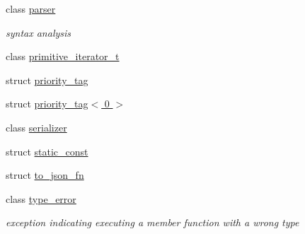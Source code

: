 \begin{DoxyCompactItemize}
class \hyperlink{classnlohmann_1_1detail_1_1parser}{parser}
\begin{DoxyCompactList}\small\item\em syntax analysis \end{DoxyCompactList}\item 
class \hyperlink{classnlohmann_1_1detail_1_1primitive__iterator__t}{primitive\+\_\+iterator\+\_\+t}
\item 
struct \hyperlink{structnlohmann_1_1detail_1_1priority__tag}{priority\+\_\+tag}
\item 
struct \hyperlink{structnlohmann_1_1detail_1_1priority__tag_3_010_01_4}{priority\+\_\+tag$<$ 0 $>$}
\item 
class \hyperlink{classnlohmann_1_1detail_1_1serializer}{serializer}
\item 
struct \hyperlink{structnlohmann_1_1detail_1_1static__const}{static\+\_\+const}
\item 
struct \hyperlink{structnlohmann_1_1detail_1_1to__json__fn}{to\+\_\+json\+\_\+fn}
\item 
class \hyperlink{classnlohmann_1_1detail_1_1type__error}{type\+\_\+error}
\begin{DoxyCompactList}\small\item\em exception indicating executing a member function with a wrong type \end{DoxyCompactList}\end{DoxyCompactItemize}

